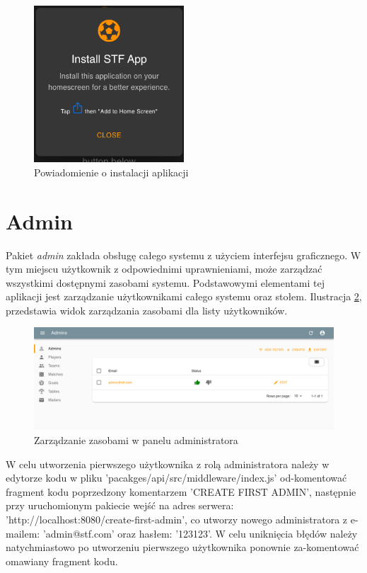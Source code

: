 \begin{figure}[h!]
  \centering
    \includegraphics[width=0.5\textwidth]{images/player/PWA_promt.png}
  \caption{Powiadomienie o instalacji aplikacji}
  \label{fig:pwa_promt}
\end{figure}


\section{Admin}

Pakiet \textit{admin} zakłada obsługę całego systemu z użyciem interfejsu graficznego. W tym miejscu użytkownik z odpowiednimi uprawnieniami, może zarządzać wszystkimi dostępnymi zasobami systemu. Podstawowymi elementami tej aplikacji jest zarządzanie użytkownikami całego systemu oraz stołem. Ilustracja \ref{fig:admin-manage-resource}, przedstawia widok zarządzania zasobami dla listy użytkowników.

\begin{figure}[h!]
  \centering
    \includegraphics[width=\textwidth]{images/admin/adminsList.png}
  \caption{Zarządzanie zasobami w panelu administratora}
  \label{fig:admin-manage-resource}
\end{figure}

W celu utworzenia pierwszego użytkownika z rolą administratora należy w edytorze kodu w pliku 'pacakges/api/src/middleware/index.js' od-komentować fragment kodu poprzedzony komentarzem 'CREATE FIRST ADMIN', następnie przy uruchomionym pakiecie wejść na adres serwera: 'http://localhost:8080/create-first-admin', co utworzy nowego administratora z e-mailem: 'admin@stf.com' oraz hasłem: '123123'. W celu uniknięcia błędów należy natychmiastowo po utworzeniu pierwszego użytkownika ponownie za-komentować omawiany fragment kodu.

